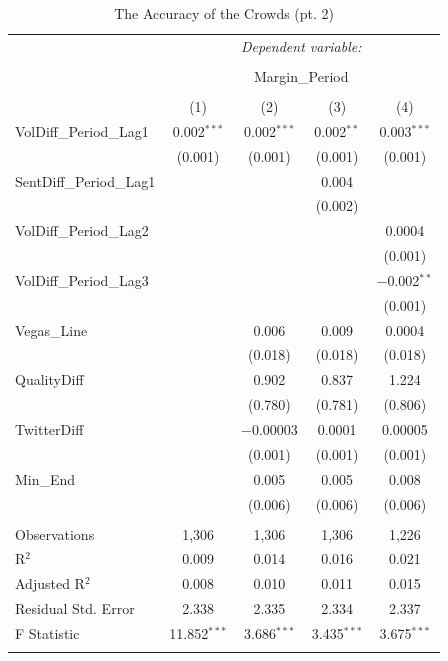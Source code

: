 \documentclass[12pt]{article}
\begin{document}
\begin{doublespacing}
\begin{table}[H] 
\centering 
\caption{The Accuracy of the Crowds (pt. 2)} 
\label{table:accuracypart2} 
\begin{tabular*}{\textwidth}{@{\extracolsep{\fill}}lcccc} 
\hline 
\hline
 & \multicolumn{4}{c}{\textit{Dependent variable:}} \\ 
\cline{2-5} 
\\[-3.0ex] & \multicolumn{4}{c}{Margin\_Period} \\ 
\\[-1.5ex] & (1) & (2) & (3) & (4)\\ 
\hline
  VolDiff\_Period\_Lag1 & 0.002$^{***}$ & 0.002$^{***}$ & 0.002$^{**}$ & 0.003$^{***}$ \\ 
  & (0.001) & (0.001) & (0.001) & (0.001) \\ 
 SentDiff\_Period\_Lag1 &  &  & 0.004 &  \\ 
  &  &  & (0.002) &  \\ 
 VolDiff\_Period\_Lag2 &  &  &  & 0.0004 \\ 
  &  &  &  & (0.001) \\ 
 VolDiff\_Period\_Lag3 &  &  &  & $-$0.002$^{**}$ \\ 
  &  &  &  & (0.001) \\ 
 Vegas\_Line &  & 0.006 & 0.009 & 0.0004 \\ 
  &  & (0.018) & (0.018) & (0.018) \\ 
 QualityDiff &  & 0.902 & 0.837 & 1.224 \\ 
  &  & (0.780) & (0.781) & (0.806) \\ 
 TwitterDiff &  & $-$0.00003 & 0.0001 & 0.00005 \\ 
  &  & (0.001) & (0.001) & (0.001) \\ 
 Min\_End &  & 0.005 & 0.005 & 0.008 \\ 
  &  & (0.006) & (0.006) & (0.006) \\ 
\hline \\[-1.8ex] 
Observations & 1,306 & 1,306 & 1,306 & 1,226 \\ 
R$^{2}$ & 0.009 & 0.014 & 0.016 & 0.021 \\ 
Adjusted R$^{2}$ & 0.008 & 0.010 & 0.011 & 0.015 \\ 
Residual Std. Error & 2.338 & 2.335 & 2.334 & 2.337 \\ 
F Statistic & 11.852$^{***}$ & 3.686$^{***}$ & 3.435$^{***}$ & 3.675$^{***}$  \\ 
\hline 
\hline \\[-1.8ex] 
\end{tabular*} 
\end{table} 


\end{doublespacing}
\end{document}
